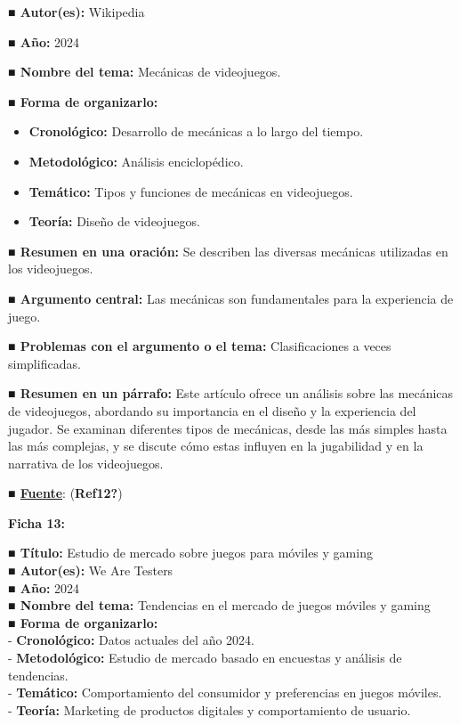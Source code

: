 \documentclass[
  letterpaper,
  DIV=11,
  numbers=noendperiod]{scrreprt}
\begin{document}
\textbf{■ Autor(es):} Wikipedia

\textbf{■ Año:} 2024

\textbf{■ Nombre del tema:} Mecánicas de videojuegos.

\textbf{■ Forma de organizarlo:}

\begin{itemize}
\item
  \textbf{Cronológico:} Desarrollo de mecánicas a lo largo del tiempo.
\item
  \textbf{Metodológico:} Análisis enciclopédico.
\item
  \textbf{Temático:} Tipos y funciones de mecánicas en videojuegos.
\item
  \textbf{Teoría:} Diseño de videojuegos.
\end{itemize}

\textbf{■ Resumen en una oración:} Se describen las diversas mecánicas
utilizadas en los videojuegos.

\textbf{■ Argumento central:} Las mecánicas son fundamentales para la
experiencia de juego.

\textbf{■ Problemas con el argumento o el tema:} Clasificaciones a veces
simplificadas.

\textbf{■ Resumen en un párrafo:} Este artículo ofrece un análisis sobre
las mecánicas de videojuegos, abordando su importancia en el diseño y la
experiencia del jugador. Se examinan diferentes tipos de mecánicas,
desde las más simples hasta las más complejas, y se discute cómo estas
influyen en la jugabilidad y en la narrativa de los videojuegos.

\textbf{■
\href{https://en.wikipedia.org/wiki/Video_game_mechanics}{Fuente}}:
(\textbf{Ref12?})

\textbf{Ficha 13:}

\textbf{■ Título:} Estudio de mercado sobre juegos para móviles y
gaming\\
\textbf{■ Autor(es):} We Are Testers\\
\textbf{■ Año:} 2024\\
\textbf{■ Nombre del tema:} Tendencias en el mercado de juegos móviles y
gaming\\
\textbf{■ Forma de organizarlo:}\\
- \textbf{Cronológico:} Datos actuales del año 2024.\\
- \textbf{Metodológico:} Estudio de mercado basado en encuestas y
análisis de tendencias.\\
- \textbf{Temático:} Comportamiento del consumidor y preferencias en
juegos móviles.\\
- \textbf{Teoría:} Marketing de productos digitales y comportamiento de
usuario.
\end{document}
